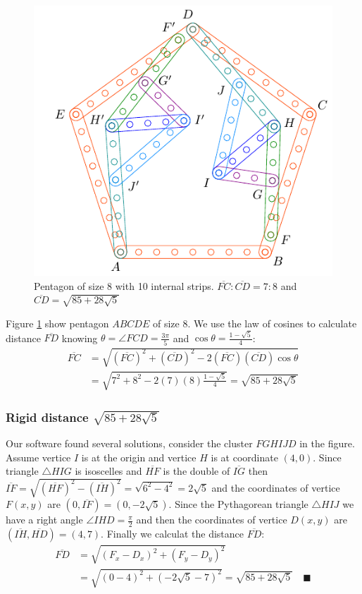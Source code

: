 \documentclass[11pt]{article}
\begin{document}
\begin{figure}[H]
\centering
\includegraphics[scale=1.1]{8/penta8-10b}
\caption{Pentagon of size 8 with 10 internal strips. $\overline{FC}:\overline{CD} = 7:8$ and $\overline{CD} = \sqrt{85 + 28\sqrt5}$}
\label{fig:penta8-10b}
\end{figure}

Figure \ref{fig:penta8-10b} show pentagon $ABCDE$ of size $8$. We use the law of cosines to calculate distance $\overline{FD}$ knowing $\theta = \angle{FCD} = \frac{3\pi}5$ and $\cos\theta = \frac{1-\sqrt5}4$:
\begin{align}
\overline{FC} &= \sqrt{(\overline{FC})^2 + (\overline{CD})^2
 - 2(\overline{FC})(\overline{CD})\cos\theta} \nonumber\\
 &= \sqrt{7^2 + 8^2 - 2(7)(8)\frac{1-\sqrt5}4} = \sqrt{85 + 28\sqrt5}
\end{align}

\subsubsection{Rigid distance $\sqrt{85 + 28\sqrt5}$}

Our software found several solutions, consider the cluster $FGHIJD$ in the figure. Assume vertice $I$ is at the origin and vertice $H$ is at coordinate $(4,0)$. Since triangle $\triangle{HIG}$ is isoscelles and $\overline{HF}$ is the double of $\overline{IG}$ then $\overline{IF} = \sqrt{(\overline{HF})^2 - (\overline{IH})^2} = \sqrt{6^2 - 4^2} = 2\sqrt{5}$ and the coordinates of vertice $F(x,y)$ are $(0,\overline{IF}) = (0,-2\sqrt5)$. Since the Pythagorean triangle $\triangle{HIJ}$ we have a right angle $\angle{IHD} = \frac{\pi}2$ and then the coordinates of vertice $D(x,y)$ are $(\overline{IH},\overline{HD}) = (4,7)$. Finally we calculat the distance $\overline{FD}$:
\begin{align}
\overline{FD} &= \sqrt{(F_x - D_x)^2 + (F_y - D_y)^2 } \nonumber\\
 &= \sqrt{(0 - 4)^2 + (-2\sqrt5 - 7)^2} = \sqrt{85 + 28\sqrt5} \quad \blacksquare
\end{align}
\end{document}
